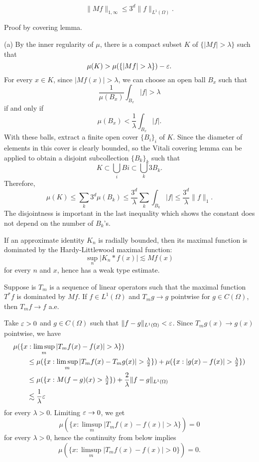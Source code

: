 \documentclass{../../large}
\begin{document}
\begin{prb}
\[\|Mf\|_{1,\infty}\le 3^d\|f\|_{L^1(\Omega)}.\]
\begin{parts}
\item Proof by covering lemma.
\end{parts}
\end{prb}
\begin{pf}
(a)
By the inner regularity of $\mu$, there is a compact subset $K$ of $\{|Mf|>\lambda\}$ such that
\[\mu(K)>\mu(\{|Mf|>\lambda\})-\e.\]
For every $x\in K$, since $|Mf(x)|>\lambda$, we can choose an open ball $B_x$ such that
\[\frac1{\mu(B_x)}\int_{B_x}|f|>\lambda\]
if and only if
\[\mu(B_x)<\frac1\lambda\int_{B_x}|f|.\]
With these balls, extract a finite open cover $\{B_i\}_i$ of $K$.
Since the diameter of elements in this cover is clearly bounded, so the Vitali covering lemma can be applied to obtain a disjoint subcollection $\{B_k\}_k$ such that
\[K\subset\bigcup_iBi\subset\bigcup_k3B_k.\]
Therefore,
\[\mu(K)
\le\sum_k3^d\mu(B_k)
\le\frac{3^d}\lambda\sum_k\int_{B_k}|f|
\le\frac{3^d}\lambda\|f\|_1.\]
The disjointness is important in the last inequality which shows the constant does not depend on the number of $B_k$'s.
\end{pf}



\begin{prb}
If an approximate identity $K_n$ is radially bounded, then its maximal function is dominated by the Hardy-Littlewood maximal function:
\[\sup_n|K_n*f(x)|\lesssim Mf(x)\]
for every $n$ and $x$, hence has a weak type estimate.
\end{prb}


\begin{prb}
Suppose is $T_m$ is a sequence of linear operators such that the maximal function $T^*f$ is dominated by $Mf$.
If $f\in L^1(\Omega)$ and $T_mg\to g$ pointwise for $g\in C(\Omega)$, then $T_mf\to f$ a.e.
\end{prb}
\begin{pf}
Take $\varepsilon>0$ and $g\in C(\Omega)$ such that $\|f-g\|_{L^1(\Omega)}<\varepsilon$.
Since $T_mg(x)\to g(x)$ pointwise, we have
\begin{align*}
&\mu(\{x:\limsup_m|T_mf(x)-f(x)|>\lambda\})\\
&\qquad\le\mu(\{x:\limsup_m|T_mf(x)-T_mg(x)|>\tfrac\lambda2\})
+\mu(\{x:|g(x)-f(x)|>\tfrac\lambda2\})\\
&\qquad\le\mu(\{x:M(f-g)(x)>\tfrac\lambda2\})+\frac2\lambda\|f-g\|_{L^1(\Omega)}\\
&\qquad\lesssim\frac1\lambda\e
\end{align*}
for every $\lambda>0$.
Limiting $\varepsilon\to0$, we get
\[\mu(\{x:\limsup_m|T_mf(x)-f(x)|>\lambda\})=0\]
for every $\lambda>0$, hence the continuity from below implies
\[\mu(\{x:\limsup_m|T_mf(x)-f(x)|>0\})=0.\]
\end{pf}
\end{document}
